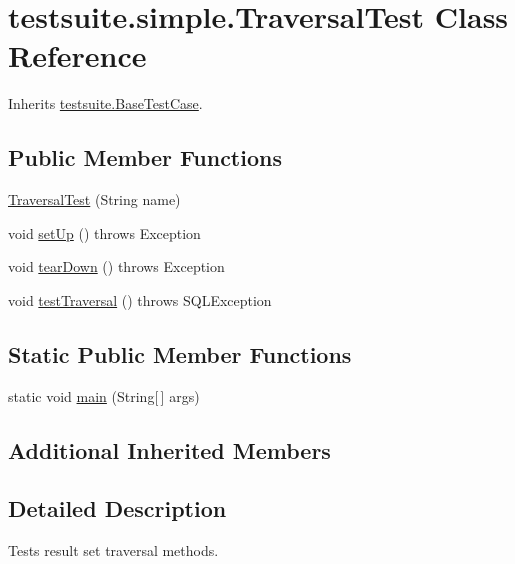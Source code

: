 \hypertarget{classtestsuite_1_1simple_1_1_traversal_test}{}\section{testsuite.\+simple.\+Traversal\+Test Class Reference}
\label{classtestsuite_1_1simple_1_1_traversal_test}


Inherits \mbox{\hyperlink{classtestsuite_1_1_base_test_case}{testsuite.\+Base\+Test\+Case}}.

\subsection*{Public Member Functions}
\begin{DoxyCompactItemize}
\item 
\mbox{\hyperlink{classtestsuite_1_1simple_1_1_traversal_test_aab43c85339e7f465ad57bb3db55b6649}{Traversal\+Test}} (String name)
\item 
void \mbox{\hyperlink{classtestsuite_1_1simple_1_1_traversal_test_a4715980c14675baf75ed7cbbacc2f7b5}{set\+Up}} ()  throws Exception 
\item 
void \mbox{\hyperlink{classtestsuite_1_1simple_1_1_traversal_test_a8f7344c09351c45f90dd4b8b9be3be40}{tear\+Down}} ()  throws Exception 
\item 
void \mbox{\hyperlink{classtestsuite_1_1simple_1_1_traversal_test_a7a7160b9550ff25b80370eed85097efb}{test\+Traversal}} ()  throws S\+Q\+L\+Exception 
\end{DoxyCompactItemize}
\subsection*{Static Public Member Functions}
\begin{DoxyCompactItemize}
\item 
static void \mbox{\hyperlink{classtestsuite_1_1simple_1_1_traversal_test_a26e0a3c13820f4daedefe73785a7fde8}{main}} (String\mbox{[}$\,$\mbox{]} args)
\end{DoxyCompactItemize}
\subsection*{Additional Inherited Members}


\subsection{Detailed Description}
Tests result set traversal methods. 


